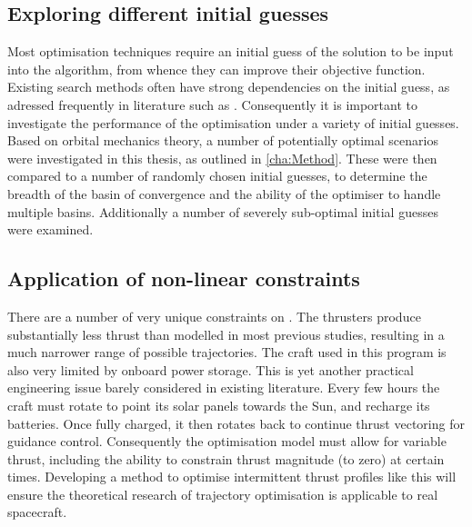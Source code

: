 \subsection{Exploring different initial guesses} \label{sub:Initial-guesses}

Most optimisation techniques require an initial guess of the solution to be input into the algorithm, from whence they can improve their objective function. Existing search methods often have strong dependencies on the initial guess, as adressed frequently in literature such as \textcite{Dachwald2005}. Consequently it is important to investigate the performance of the optimisation under a variety of initial guesses. Based on orbital mechanics theory, a number of potentially optimal scenarios were investigated in this thesis, as outlined in \autoref{cha:Method}. These were then compared to a number of randomly chosen initial guesses, to determine the breadth of the basin of convergence and the ability of the optimiser to handle multiple basins. Additionally a number of severely sub-optimal initial guesses were examined.

\subsection{Application of non-linear constraints} \label{sub:Model-non-linear-constraints}

There are a number of very unique constraints on \BW. The thrusters produce substantially less thrust than modelled in most previous studies, resulting in a much narrower range of possible trajectories. The craft used in this program is also very limited by onboard power storage. This is yet another practical engineering issue barely considered in existing literature. Every few hours the craft must rotate to point its solar panels towards the Sun, and recharge its batteries. Once fully charged, it then rotates back to continue thrust vectoring for guidance control. Consequently the optimisation model must allow for variable thrust, including the ability to constrain thrust magnitude (to zero) at certain times. Developing a method to optimise intermittent thrust profiles like this will ensure the theoretical research of trajectory optimisation is applicable to real spacecraft.

